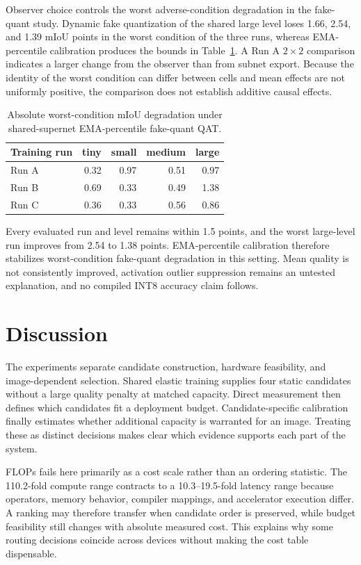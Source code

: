 \documentclass[a4paper,review,12pt]{elsarticle}
\newcommand{\miou}{mIoU}
\begin{document}
Observer choice controls the worst adverse-condition degradation in the fake-quant study. Dynamic fake quantization of the shared large level loses 1.66, 2.54, and 1.39 \miou{} points in the worst condition of the three runs, whereas EMA-percentile calibration produces the bounds in Table~\ref{tab:qat}. A Run A $2\times2$ comparison indicates a larger change from the observer than from subnet export. Because the identity of the worst condition can differ between cells and mean effects are not uniformly positive, the comparison does not establish additive causal effects.

\begin{table}[H]
\centering
\caption{Absolute worst-condition \miou{} degradation under shared-supernet EMA-percentile fake-quant QAT.}
\label{tab:qat}
\begin{tabular}{@{}lrrrr@{}}
\toprule
Training run & tiny & small & medium & large \\
\midrule
Run A & 0.32 & 0.97 & 0.51 & 0.97 \\
Run B & 0.69 & 0.33 & 0.49 & 1.38 \\
Run C & 0.36 & 0.33 & 0.56 & 0.86 \\
\bottomrule
\end{tabular}
\end{table}

Every evaluated run and level remains within 1.5 points, and the worst large-level run improves from 2.54 to 1.38 points. EMA-percentile calibration therefore stabilizes worst-condition fake-quant degradation in this setting. Mean quality is not consistently improved, activation outlier suppression remains an untested explanation, and no compiled INT8 accuracy claim follows.

\section{Discussion}
\label{sec:discussion}

The experiments separate candidate construction, hardware feasibility, and image-dependent selection. Shared elastic training supplies four static candidates without a large quality penalty at matched capacity. Direct measurement then defines which candidates fit a deployment budget. Candidate-specific calibration finally estimates whether additional capacity is warranted for an image. Treating these as distinct decisions makes clear which evidence supports each part of the system.

FLOPs fails here primarily as a cost scale rather than an ordering statistic. The 110.2-fold compute range contracts to a 10.3--19.5-fold latency range because operators, memory behavior, compiler mappings, and accelerator execution differ. A ranking may therefore transfer when candidate order is preserved, while budget feasibility still changes with absolute measured cost. This explains why some routing decisions coincide across devices without making the cost table dispensable.
\end{document}
